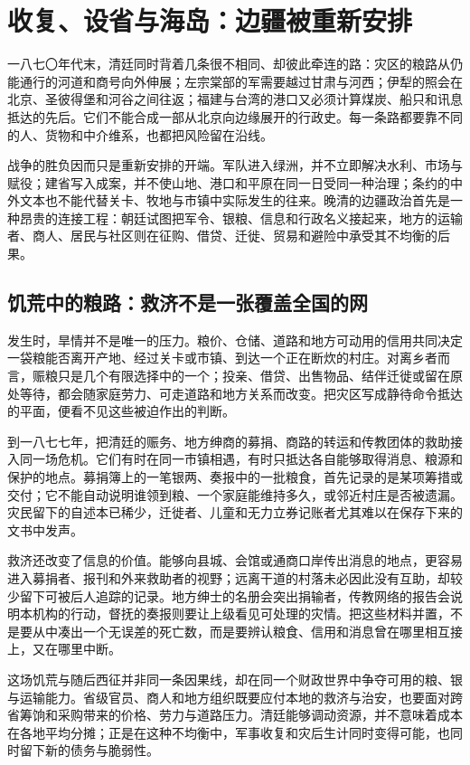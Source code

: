\section{收复、设省与海岛：边疆被重新安排}

一八七〇年代末，清廷同时背着几条很不相同、却彼此牵连的路：灾区的粮路从仍能通行的河道和商号向外伸展；左宗棠部的军需要越过甘肃与河西；伊犁的照会在北京、圣彼得堡和河谷之间往返；福建与台湾的港口又必须计算煤炭、船只和讯息抵达的先后。它们不能合成一部从北京向边缘展开的行政史。每一条路都要靠不同的人、货物和中介维系，也都把风险留在沿线。

战争的胜负因而只是重新安排的开端。军队进入绿洲，并不立即解决水利、市场与赋役；建省写入成案，并不使山地、港口和平原在同一日受同一种治理；条约的中外文本也不能代替关卡、牧地与市镇中实际发生的往来。晚清的边疆政治首先是一种昂贵的连接工程：朝廷试图把军令、银粮、信息和行政名义接起来，地方的运输者、商人、居民与社区则在征购、借贷、迁徙、贸易和避险中承受其不均衡的后果。

\subsection{饥荒中的粮路：救济不是一张覆盖全国的网}

发生时，旱情并不是唯一的压力。粮价、仓储、道路和地方可动用的信用共同决定一袋粮能否离开产地、经过关卡或市镇、到达一个正在断炊的村庄。对离乡者而言，赈粮只是几个有限选择中的一个；投亲、借贷、出售物品、结伴迁徙或留在原处等待，都会随家庭劳力、可走道路和地方关系而改变。把灾区写成静待命令抵达的平面，便看不见这些被迫作出的判断。

到一八七七年，把清廷的赈务、地方绅商的募捐、商路的转运和传教团体的救助接入同一场危机。它们有时在同一市镇相遇，有时只抵达各自能够取得消息、粮源和保护的地点。募捐簿上的一笔银两、奏报中的一批粮食，首先记录的是某项筹措或交付；它不能自动说明谁领到粮、一个家庭能维持多久，或邻近村庄是否被遗漏。灾民留下的自述本已稀少，迁徙者、儿童和无力立券记账者尤其难以在保存下来的文书中发声。

救济还改变了信息的价值。能够向县城、会馆或通商口岸传出消息的地点，更容易进入募捐者、报刊和外来救助者的视野；远离干道的村落未必因此没有互助，却较少留下可被后人追踪的记录。地方绅士的名册会突出捐输者，传教网络的报告会说明本机构的行动，督抚的奏报则要让上级看见可处理的灾情。把这些材料并置，不是要从中凑出一个无误差的死亡数，而是要辨认粮食、信用和消息曾在哪里相互接上，又在哪里中断。

这场饥荒与随后西征并非同一条因果线，却在同一个财政世界中争夺可用的粮、银与运输能力。省级官员、商人和地方组织既要应付本地的救济与治安，也要面对跨省筹饷和采购带来的价格、劳力与道路压力。清廷能够调动资源，并不意味着成本在各地平均分摊；正是在这种不均衡中，军事收复和灾后生计同时变得可能，也同时留下新的债务与脆弱性。

